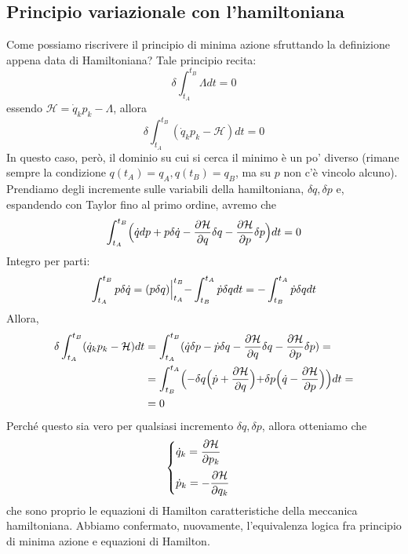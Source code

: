\documentclass[a4paper,openany]{article}
\begin{document}
	\subsection{Principio variazionale con l'hamiltoniana}
	Come possiamo riscrivere il principio di minima azione sfruttando la definizione appena data di Hamiltoniana? Tale principio recita:
	\begin{equation}\label{key}
		\delta \int_{t_A}^{t_B} \Lambda dt = 0
	\end{equation}
	essendo $\mathcal{H} = \dot{q}_k p_k - \Lambda$, allora
	\begin{equation}\label{key}
		\delta \int_{t_A}^{t_B}(\dot{q}_k p_k-\mathcal{H}) dt = 0
	\end{equation}
	In questo caso, però, il dominio su cui si cerca il minimo è un po' diverso (rimane sempre la condizione $q(t_A)=q_A, q(t_B)=q_B$, ma su $p$ non c'è vincolo alcuno). Prendiamo degli incremente sulle variabili della hamiltoniana, $\delta q, \delta p$ e, espandendo con Taylor fino al primo ordine, avremo che
	\begin{equation}\label{key}
		\int_{t_A}^{t_B}\Bigl(\dot{q}dp+p\delta \dot{q} - \dfrac{\partial \mathcal{
				H}}{\partial q}\delta q - \dfrac{\partial \mathcal{
				H}}{\partial p}\delta p\Bigl)dt = 0
	\end{equation}
	Integro per parti:
	\begin{equation}\label{key}
		\int_{t_A}^{t_B}p\delta\dot{q} = (p\delta q)\Bigl|^{t_B}_{t_A}- \int_{t_B}^{t_A}\dot{p}\delta q dt=-\int_{t_B}^{t_A}\dot{p}\delta q dt 
	\end{equation}
	Allora, 
	\begin{equation}\label{key}
		\begin{aligned}
			\delta \int_{t_A}^{t_B}(\dot{q}_k p_k-\mathcal{H}) dt &= \int_{t_A}^{t_B}(\dot{q}\delta p - \dot{p}\delta q - \dfrac{\partial \mathcal{
					H}}{\partial q}\delta q - \dfrac{\partial \mathcal{
					H}}{\partial p}\delta p) = \\
			&= \int_{t_B}^{t_A}\Bigl(-\delta q \Bigl(\dot{p}+\dfrac{\partial \mathcal{H}}{\partial q} \Bigl)+ \delta p \Bigl(\dot{q}-\dfrac{\partial \mathcal{H}}{\partial p}\Bigl)\Bigl)dt = 
			\\ &= 0
		\end{aligned}
	\end{equation}
	Perché questo sia vero per qualsiasi incremento $\delta q, \delta p$, allora otteniamo che 
	\begin{equation}
		\begin{cases}
			\dot{q}_k = \dfrac{\partial \mathcal{H}}{\partial p_k}\vspace{2mm}   \\
			
			\dot{p}_k = -\dfrac{\partial \mathcal{H}}{\partial q_k}
		\end{cases}
	\end{equation}
	che sono proprio le equazioni di Hamilton caratteristiche della meccanica hamiltoniana. Abbiamo confermato, nuovamente, l'equivalenza logica fra principio di minima azione e equazioni di Hamilton.
	
\end{document}
